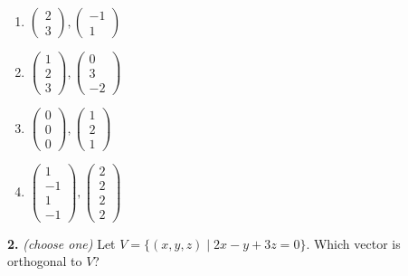 \documentclass[10pt,a4paper]{article}
\begin{document}
\begin{enumerate}[label=(\Alph*)]
\item \(\begin{pmatrix}2\\3\end{pmatrix},\begin{pmatrix}-1\\1\end{pmatrix}\)
\item \(\begin{pmatrix}1\\2\\3\end{pmatrix},\begin{pmatrix}0\\3\\-2\end{pmatrix}\)
\item \(\begin{pmatrix}0\\0\\0\end{pmatrix},\begin{pmatrix}1\\2\\1\end{pmatrix}\)
\item \(\begin{pmatrix}1\\-1\\1\\-1\end{pmatrix},\begin{pmatrix}2\\2\\2\\2\end{pmatrix}\)
\end{enumerate}
\smallskip
\textbf{2.} \textit{(choose one)} Let \(V=\{(x,y,z)\mid 2x-y+3z=0\}\). Which vector is orthogonal to \(V\)?
\end{document}
